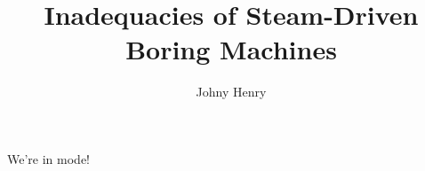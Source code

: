 \documentclass[draft,subfig]{drexel-thesis}
\author{Johny Henry}
\title{Inadequacies of Steam-Driven Boring Machines}
\begin{document}
\begin{DUTpreamble} %

\begin{dedications}
We're in  mode!

\Blindtext[3]
\end{dedications}

\begin{acknowledgments}
\Blindtext[3]
\end{acknowledgments}

\tableofcontents
\listoftables
\listoffigures

\begin{abstract}
\Blindtext[3]
\end{abstract}
\end{DUTpreamble}

\begin{thesis}

\end{thesis}



\appendix


\begin{vita}
\Blindtext[3]
\end{vita}
\end{document}
